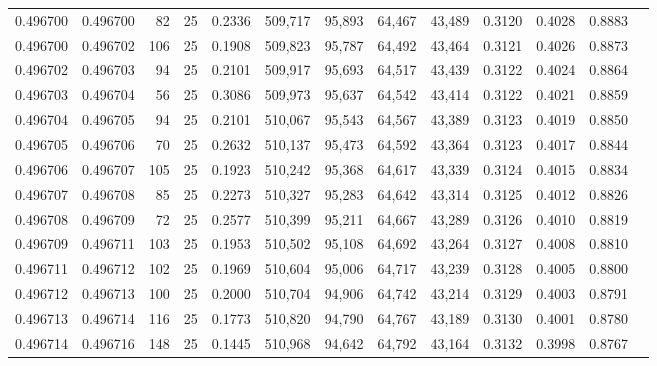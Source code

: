 \begin{tabular}{rrrrrrrrrrrrr}
0.496700 & 0.496700 &    82 &  25 &                                     0.2336 & 509,717 &  95,893 &  64,467 &  43,489 & 0.3120 & 0.4028 & 0.8883 \\
0.496700 & 0.496702 &   106 &  25 &                                     0.1908 & 509,823 &  95,787 &  64,492 &  43,464 & 0.3121 & 0.4026 & 0.8873 \\
0.496702 & 0.496703 &    94 &  25 &                                     0.2101 & 509,917 &  95,693 &  64,517 &  43,439 & 0.3122 & 0.4024 & 0.8864 \\
0.496703 & 0.496704 &    56 &  25 &                                     0.3086 & 509,973 &  95,637 &  64,542 &  43,414 & 0.3122 & 0.4021 & 0.8859 \\
0.496704 & 0.496705 &    94 &  25 &                                     0.2101 & 510,067 &  95,543 &  64,567 &  43,389 & 0.3123 & 0.4019 & 0.8850 \\
0.496705 & 0.496706 &    70 &  25 &                                     0.2632 & 510,137 &  95,473 &  64,592 &  43,364 & 0.3123 & 0.4017 & 0.8844 \\
0.496706 & 0.496707 &   105 &  25 &                                     0.1923 & 510,242 &  95,368 &  64,617 &  43,339 & 0.3124 & 0.4015 & 0.8834 \\
0.496707 & 0.496708 &    85 &  25 &                                     0.2273 & 510,327 &  95,283 &  64,642 &  43,314 & 0.3125 & 0.4012 & 0.8826 \\
0.496708 & 0.496709 &    72 &  25 &                                     0.2577 & 510,399 &  95,211 &  64,667 &  43,289 & 0.3126 & 0.4010 & 0.8819 \\
0.496709 & 0.496711 &   103 &  25 &                                     0.1953 & 510,502 &  95,108 &  64,692 &  43,264 & 0.3127 & 0.4008 & 0.8810 \\
0.496711 & 0.496712 &   102 &  25 &                                     0.1969 & 510,604 &  95,006 &  64,717 &  43,239 & 0.3128 & 0.4005 & 0.8800 \\
0.496712 & 0.496713 &   100 &  25 &                                     0.2000 & 510,704 &  94,906 &  64,742 &  43,214 & 0.3129 & 0.4003 & 0.8791 \\
0.496713 & 0.496714 &   116 &  25 &                                     0.1773 & 510,820 &  94,790 &  64,767 &  43,189 & 0.3130 & 0.4001 & 0.8780 \\
0.496714 & 0.496716 &   148 &  25 &                                     0.1445 & 510,968 &  94,642 &  64,792 &  43,164 & 0.3132 & 0.3998 & 0.8767 \\

\end{tabular}
